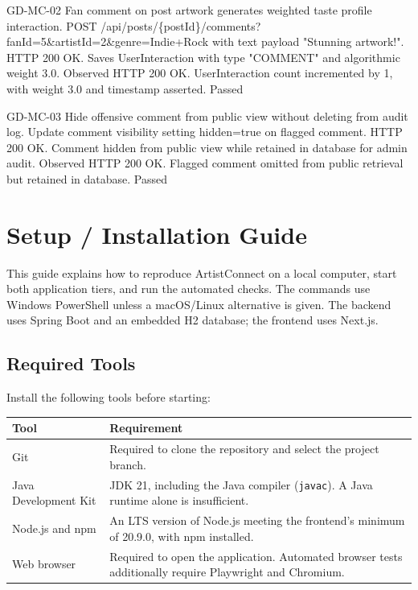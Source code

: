\documentclass[11pt]{report}
\begin{document}
\garretttestcase
{GD-MC-02}
{Fan comment on post artwork generates weighted taste profile interaction.}
{POST /api/posts/\{postId\}/comments?fanId=5\&artistId=2\&genre=Indie+Rock with text payload "Stunning artwork!".}
{HTTP 200 OK. Saves UserInteraction with type "COMMENT" and algorithmic weight 3.0.}
{Observed HTTP 200 OK. UserInteraction count incremented by 1, with weight 3.0 and timestamp asserted.}
{Passed}

\clearpage
\garretttestcase
{GD-MC-03}
{Hide offensive comment from public view without deleting from audit log.}
{Update comment visibility setting hidden=true on flagged comment.}
{HTTP 200 OK. Comment hidden from public view while retained in database for admin audit.}
{Observed HTTP 200 OK. Flagged comment omitted from public retrieval but retained in database.}
{Passed}

\chapter{Setup / Installation Guide}
This guide explains how to reproduce ArtistConnect on a local computer, start both application tiers, and run the automated checks. The commands use Windows PowerShell unless a macOS/Linux alternative is given. The backend uses Spring Boot and an embedded H2 database; the frontend uses Next.js.

\section{Required Tools}
Install the following tools before starting:
\begin{center}
\renewcommand{\arraystretch}{1.2}
\begin{tabular}{|>{\raggedright\arraybackslash}p{}|>{\raggedright\arraybackslash}p{}|}
\hline
\textbf{Tool} & \textbf{Requirement} \\ \hline
Git & Required to clone the repository and select the project branch. \\ \hline
Java Development Kit & JDK 21, including the Java compiler (\texttt{javac}). A Java runtime alone is insufficient. \\ \hline
Node.js and npm & An LTS version of Node.js meeting the frontend's minimum of 20.9.0, with npm installed. \\ \hline
Web browser & Required to open the application. Automated browser tests additionally require Playwright and Chromium. \\ \hline
\end{tabular}
\end{center}
\end{document}
